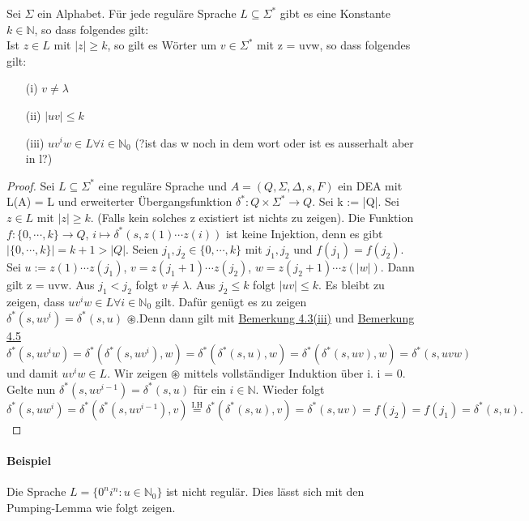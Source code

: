   Sei \(\Sigma\) ein Alphabet. Für jede reguläre Sprache \(L \subseteq \Sigma^*\) gibt es eine Konstante \(k \in \mathbb{N}\), so dass folgendes gilt:\\ Ist \(z \in L\) mit \(|z| \geq k\), so gilt es Wörter um \(v \in \Sigma^*\) mit z = uvw, so dass folgendes gilt:
  \begin{itemize}
    \item [(i)]\(v \not = \lambda\)
    \item [(ii)]\(|uv| \leq k\)
    \item [(iii)]\(uv^iw \in L \forall i \in \mathbb{N}_0\) (?ist das w noch in dem wort oder ist es ausserhalt aber in l?)
  \end{itemize} 
  \begin{proof}
    Sei \(L \subseteq \Sigma^*\) eine reguläre Sprache und \(A = (Q, \Sigma, \Delta, s, F)\) ein DEA mit L(A) = L und erweiterter Übergangsfunktion \(\delta^*: Q \times \Sigma^* \to Q\). Sei k := |Q|. Sei \(z \in L\)  mit \(|z| \geq k\). (Falls kein solches z existiert ist nichts zu zeigen). Die Funktion \(f: \{0,\cdots, k\} \to Q\), \(i \mapsto \delta^*(s, z(1) \cdots z(i))\) ist keine Injektion, denn es gibt \(|\{0, \cdots, k\}| = k + 1 > |Q|\). Seien \(j_1, j_2 \in \{0, \cdots, k\}\) mit \(j_1, j_2\) und \(f(j_1) = f(j_2)\). Sei \(u := z(1)\cdots z(j_1)\), \(v = z(j_1+1)\cdots z(j_2)\), \(w = z(j_2 + 1) \cdots z(|w|)\). Dann gilt z = uvw. Aus \(j_1 < j_2\) folgt \(v \not = \lambda\). Aus \(j_2 \leq k\) folgt \(|uv| \leq k\). Es bleibt zu zeigen, dass \(uv^iw\in L \forall i \in \mathbb{N}_0\) gilt. Dafür genügt es zu zeigen \(\delta^*(s, uv^i) = \delta^*(s, u)\) \(\circledast \).Denn dann gilt mit \hyperref[subsec:4.3]{Bemerkung 4.3(iii)} und \hyperref[subsec:4.5]{Bemerkung 4.5} 
    \[
      \delta^*(s, uv^iw) = \delta^*(\delta^*(s, uv^i), w) = \delta^* (\delta^*(s, u), w) = \delta^*(\delta^*(s, uv), w) = \delta^*(s, uvw)
    \] 
    und damit \(uv^iw \in L\). Wir zeigen \(\circledast \) mittels vollständiger Induktion über i. i = 0. Gelte nun \(\delta^*(s, uv^{i-1}) = \delta^*(s, u)\) für ein \(i \in \mathbb{N}\). Wieder folgt 
    \[
      \delta^{*}(s, uw^i) = \delta^*(\delta^*(s, uv^{i-1}), v) \stackrel{\text{I.H}}{=} \delta^*(\delta^*(s,u), v) = \delta^*(s, uv) = f(j_2) = f(j_1) = \delta^*(s,u).
    \]
  \end{proof}

  \paragraph{Beispiel} 
    Die Sprache \(L = \{0^n i^n : u \in \mathbb{N}_0\}\) ist nicht regulär. Dies lässt sich mit den Pumping-Lemma wie folgt zeigen.

